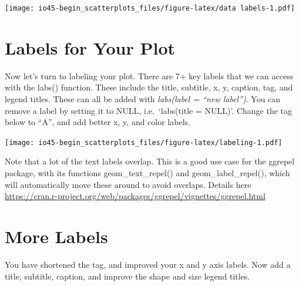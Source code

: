 \documentclass[
]{book}
\newenvironment{Shaded}{\begin{snugshade}}{\end{snugshade}}
\newcommand{\DataTypeTok}[1]{\textcolor[rgb]{0.13,0.29,0.53}{#1}}
\newcommand{\KeywordTok}[1]{\textcolor[rgb]{0.13,0.29,0.53}{\textbf{#1}}}
\newcommand{\NormalTok}[1]{#1}
\newcommand{\OperatorTok}[1]{\textcolor[rgb]{0.81,0.36,0.00}{\textbf{#1}}}
\newcommand{\StringTok}[1]{\textcolor[rgb]{0.31,0.60,0.02}{#1}}
\begin{document}
\texttt{[image: io45-begin\_scatterplots\_files/figure-latex/data labels-1.pdf]}

\hypertarget{labels-for-your-plot}{%
\chapter{Labels for Your Plot}\label{labels-for-your-plot}}

Now let's turn to labeling your plot. There are 7+ key labels that we can access with the labs() function. These include the title, subtitle, x, y, caption, tag, and legend titles. These can all be added with \emph{labs(label = ``new label'')}. You can remove a label by setting it to NULL, i.e.~`labs(title = NULL)'. Change the tag below to ``A'', and add better x, y, and color labels.

\begin{Shaded}
\end{Shaded}

\texttt{[image: io45-begin\_scatterplots\_files/figure-latex/labeling-1.pdf]}

Note that a lot of the text labels overlap. This is a good use case for the ggrepel package, with its functions geom\_text\_repel() and geom\_label\_repel(), which will automatically move these around to avoid overlaps. Details here \url{https://cran.r-project.org/web/packages/ggrepel/vignettes/ggrepel.html}

\hypertarget{more-labels}{%
\chapter{More Labels}\label{more-labels}}

You have shortened the tag, and improved your x and y axis labels. Now add a title, subtitle, caption, and improve the shape and size legend titles.
\end{document}
